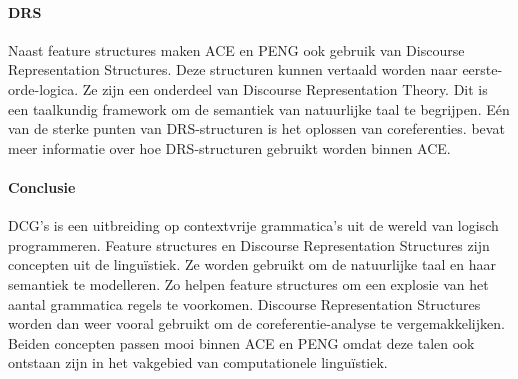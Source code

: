 \documentclass[]{article}
\theoremstyle{definition}
\begin{document}
\paragraph{DRS} Naast feature structures maken ACE en PENG ook gebruik van Discourse Representation Structures. Deze structuren kunnen vertaald worden naar eerste-orde-logica. Ze zijn een onderdeel van Discourse Representation Theory. Dit is een taalkundig framework om de semantiek van natuurlijke taal te begrijpen. Eén van de sterke punten van DRS-structuren is het oplossen van coreferenties. \cite{Fuchs2008drs} bevat meer informatie over hoe DRS-structuren gebruikt worden binnen ACE.

\paragraph{Conclusie} DCG's is een uitbreiding op contextvrije grammatica's uit de wereld van logisch programmeren. Feature structures en Discourse Representation Structures zijn concepten uit de linguïstiek. Ze worden gebruikt om de natuurlijke taal en haar semantiek te modelleren. Zo helpen feature structures om een explosie van het aantal grammatica regels te voorkomen. Discourse Representation Structures worden dan weer vooral gebruikt om de coreferentie-analyse te vergemakkelijken. Beiden concepten passen mooi binnen ACE en PENG omdat deze talen ook ontstaan zijn in het vakgebied van computationele linguïstiek.


\end{document}
